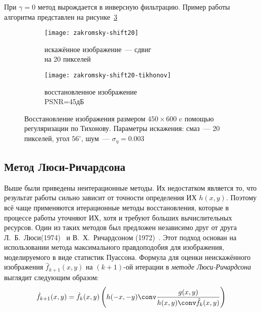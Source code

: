 При $\gamma = 0$ метод вырождается в инверсную фильтрацию. Пример работы алгоритма представлен на рисунке~\ref{fig:tikhonov}
\begin{figure}[h!]
	\begin{subfigure}[b]{0.5\textwidth}
		\texttt{[image: zakromsky-shift20]}
		\caption{искажённое изображение~--- сдвиг \\на 20 пикселей}
		\label{fig:zakromskiyShift20}
	\end{subfigure}%
	\begin{subfigure}[b]{0.5\textwidth}
		\texttt{[image: zakromsky-shift20-tikhonov]}
		\caption{восстановленное изображение\\ PSNR=45дБ}
		\label{fig:zakromskiyShift20Tikhonov}
	\end{subfigure}%
	\caption{Восстановление изображения размером $450\times 600$ c помощью регуляризации по Тихонову. Параметры искажения: смаз~--- 20 пикселей, угол $56^\circ$, шум~--- $\sigma_\eta=0.003$}
	\label{fig:tikhonov}
\end{figure}

\subsection{Метод Люси-Ричардсона}
Выше были приведены неитерационные методы. Их недостатком является то, что результат работы сильно зависит от точности определения ИХ $h(x,y)$. Поэтому всё чаще применяются итерационные методы восстановления, которые в процессе работы уточняют ИХ, хотя и требуют больших вычислительных ресурсов. Один из таких методов был предложен независимо друг от друга Л.~Б.~Люси(1974)~\cite{lucy} и В.~Х.~Ричардсоном (1972)~\cite{richardson}. Этот подход основан на использовании метода максимального правдоподобия для изображения, моделируемого в виде статистик Пуассона. Формула для оценки неискажённого изображения $\hat{f}_{k+1}(x,y)$ на $(k + 1)$-ой итерации в \textit{методе Люси-Ричардсона} выглядит следующим образом:
\begin{equation}\label{eq:lucy}
	\hat{f}_{k+1}(x,y) = \hat{f}_k(x,y) \left(h(-x,-y) \conv \frac{g(x,y)}{h(x,y) \conv \hat{f}_k(x,y)}\right)
\end{equation}

